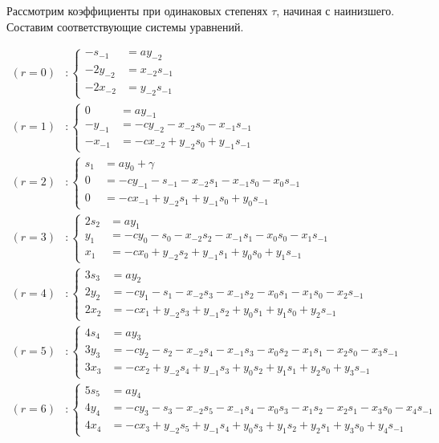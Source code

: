 Рассмотрим коэффициенты при одинаковых степенях $ \tau $, начиная с наинизшего. Составим соответствующие системы уравнений.
 
$$
	\begin{aligned}
		(r = 0) &:		
		\left\{
			\begin{aligned}
				-s_{-1} &= ay_{-2} \\
				-2y_{-2} &= x_{-2} s_{-1} \\
				-2x_{-2} &= y_{-2} s_{-1}
			\end{aligned}
		\right.
		\\		
		(r = 1) &:	
		\left\{
			\begin{aligned}
				0 &= ay_{-1} \\
				-y_{-1} &= -cy_{-2} - x_{-2}s_0 - x_{-1}s_{-1}  \\
				-x_{-1} &= -cx_{-2} + y_{-2}s_0 + y_{-1}s_{-1}
			\end{aligned}
		\right.
		\\
		(r = 2) &:	
		\left\{
			\begin{aligned}
				s_1 &= ay_{0} + \gamma \\
				0 &= -cy_{-1} - s_{-1} - x_{-2}s_1 - x_{-1}s_0 - x_0s_{-1}  \\
				0 &= -cx_{-1} + y_{-2}s_1 + y_{-1}s_0 + y_{0}s_{-1}
			\end{aligned}
		\right.
		\\
		(r = 3) &:	
		\left\{
			\begin{aligned}
				2s_2 &= ay_{1} \\
				y_1 &= -cy_{0} - s_0 - x_{-2}s_2 - x_{-1}s_1 - x_0s_0 - x_1s_{-1}  \\
				x_1 &= -cx_{0} + y_{-2}s_2 + y_{-1}s_1 + y_{0}s_0 + y_1s_{-1}
			\end{aligned}
		\right.
		\\
		(r = 4) &:	
		\left\{
			\begin{aligned}
				3s_3 &= ay_{2} \\
				2y_2 &= -cy_{1} - s_1 - x_{-2}s_3 - x_{-1}s_2 - x_0s_1 - x_1s_0 - x_2s_{-1}  \\
				2x_2 &= -cx_{1} + y_{-2}s_3 + y_{-1}s_2 + y_{0}s_1 + y_1s_0 + y_2s_{-1}
			\end{aligned}
		\right.
		\\
		(r = 5) &:	
		\left\{
			\begin{aligned}
				4s_4 &= ay_{3} \\
				3y_3 &= -cy_{2} - s_2 - x_{-2}s_4 - x_{-1}s_3 - x_0s_2 - x_1s_1 - x_2s_0 - x_3s_{-1} \\
				3x_3 &= -cx_{2} + y_{-2}s_4 + y_{-1}s_3 + y_{0}s_2 + y_1s_1 + y_2s_0 + y_3s_{-1}
			\end{aligned}
		\right.
		\\
		(r = 6) &:	
		\left\{
			\begin{aligned}
				5s_5 &= ay_{4} \\
				4y_4 &= -cy_{3} - s_3 - x_{-2}s_5 - x_{-1}s_4 - x_0s_3 - x_1s_2 - x_2s_1 - x_3s_0 - x_4s_{-1} \\
				4x_4 &= -cx_{3} + y_{-2}s_5 + y_{-1}s_4 + y_{0}s_3 + y_1s_2 + y_2s_1 + y_3s_0 + y_4s_{-1}
			\end{aligned}
		\right. 
	\end{aligned}
$$
